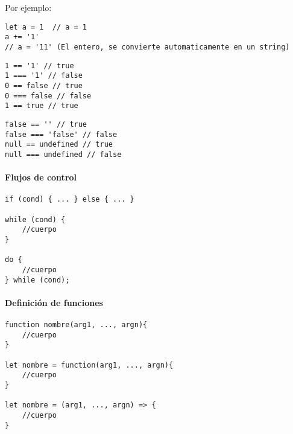 Por ejemplo:
\begin{centrado}
\begin{verbatim}
let a = 1  // a = 1
a += '1'
// a = '11' (El entero, se convierte automaticamente en un string)
\end{verbatim}

\end{centrado}

\begin{multicols}{2}
\begin{verbatim}
1 == '1' // true
1 === '1' // false
0 == false // true
0 === false // false
1 == true // true
\end{verbatim}
\vfill\null
\columnbreak
\begin{verbatim}
false == '' // true
false === 'false' // false
null == undefined // true
null === undefined // false
\end{verbatim}
\end{multicols}

\newpage
\paragraph{Flujos de control}
\begin{centrado}
\begin{verbatim}
if (cond) { ... } else { ... }

while (cond) {
    //cuerpo
}

do {
    //cuerpo
} while (cond);
\end{verbatim}

\end{centrado}

\paragraph{Definición de funciones}
\begin{centrado}
\begin{verbatim}
function nombre(arg1, ..., argn){
    //cuerpo
}

let nombre = function(arg1, ..., argn){
    //cuerpo
}

let nombre = (arg1, ..., argn) => {
    //cuerpo
}
\end{verbatim}

\end{centrado}

